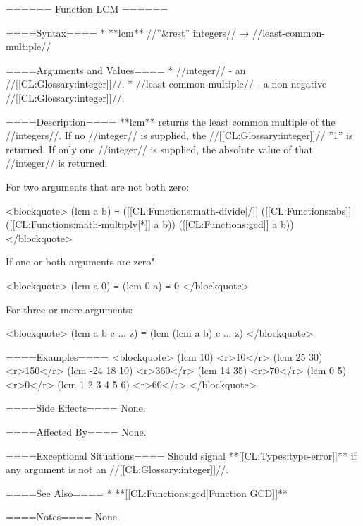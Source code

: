 ====== Function LCM ======

====Syntax====
  * **lcm** //''&rest'' integers// → //least-common-multiple//

====Arguments and Values====
  * //integer// - an //[[CL:Glossary:integer]]//.
  * //least-common-multiple// - a non-negative //[[CL:Glossary:integer]]//.

====Description====
**lcm** returns the least common multiple of the //integers//. If no //integer// is supplied, the //[[CL:Glossary:integer]]// ''1'' is returned. If only one //integer// is supplied, the absolute value of that //integer// is returned.

For two arguments that are not both zero:

<blockquote>
(lcm a b) ≡ ([[CL:Functions:math-divide|/]] ([[CL:Functions:abs]] ([[CL:Functions:math-multiply|*]] a b)) ([[CL:Functions:gcd]] a b))
</blockquote>

If one or both arguments are zero"

<blockquote>
(lcm a 0) ≡ (lcm 0 a) ≡ 0
</blockquote>

For three or more arguments:

<blockquote>
(lcm a b c ... z) ≡ (lcm (lcm a b) c ... z)
</blockquote>

====Examples====
<blockquote>
(lcm 10) <r>10</r>
(lcm 25 30) <r>150</r>
(lcm -24 18 10) <r>360</r>
(lcm 14 35) <r>70</r>
(lcm 0 5) <r>0</r>
(lcm 1 2 3 4 5 6) <r>60</r>
</blockquote>

====Side Effects====
None.

====Affected By====
None.

====Exceptional Situations====
Should signal **[[CL:Types:type-error]]** if any argument is not an //[[CL:Glossary:integer]]//.

====See Also====
  * **[[CL:Functions:gcd|Function GCD]]**

====Notes====
None.

